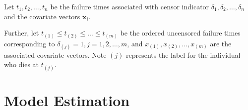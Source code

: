 Let $t_{1},t_{2},\ldots,t_{n}$ be the failure times associated with censor indicator $\delta_{1},\delta_{2},\ldots,\delta_{n}$ and the covariate vectors $\mathbf{x}_{i}$.

Further, let $t_{(1)}\leq t_{(2)}\leq\ldots\leq t_{(m)}$ be the ordered uncensored failure times corresponding to $\delta_{(j)}=1,j=1,2,\ldots,m$, and $x_{(1)},x_{(2)},\ldots,x_{(m)}$ are the associated covariate vectors. Note $(j)$ represents the label for the individual who dies at $t_{(j)}$.

\section{Model Estimation}


